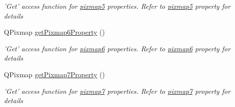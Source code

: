 \begin{DoxyCompactItemize}
\begin{DoxyCompactList}\small\item\em 'Get' access function for \hyperlink{classQELabel_a059f6c9e30a31cb7783223bfb5961ed7}{pixmap5} properties. Refer to \hyperlink{classQELabel_a059f6c9e30a31cb7783223bfb5961ed7}{pixmap5} property for details \end{DoxyCompactList}\item 
\hypertarget{classQELabel_adc0fdc24ba22dbf90c84753619c2f993}{
QPixmap \hyperlink{classQELabel_adc0fdc24ba22dbf90c84753619c2f993}{getPixmap6Property} ()}
\label{classQELabel_adc0fdc24ba22dbf90c84753619c2f993}

\begin{DoxyCompactList}\small\item\em 'Get' access function for \hyperlink{classQELabel_aef12b4be5226b9e2660b69873f029122}{pixmap6} properties. Refer to \hyperlink{classQELabel_aef12b4be5226b9e2660b69873f029122}{pixmap6} property for details \end{DoxyCompactList}\item 
\hypertarget{classQELabel_a11f2aa888207a26ff6ba0feb313a315f}{
QPixmap \hyperlink{classQELabel_a11f2aa888207a26ff6ba0feb313a315f}{getPixmap7Property} ()}
\label{classQELabel_a11f2aa888207a26ff6ba0feb313a315f}

\begin{DoxyCompactList}\small\item\em 'Get' access function for \hyperlink{classQELabel_a65da0ef3bc0c5f289070763c7c794e77}{pixmap7} properties. Refer to \hyperlink{classQELabel_a65da0ef3bc0c5f289070763c7c794e77}{pixmap7} property for details \end{DoxyCompactList}\end{DoxyCompactItemize}
